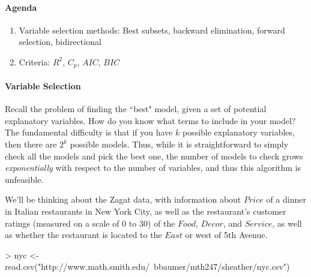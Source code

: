 \documentclass[10pt]{article}
\begin{document}


\paragraph{Agenda}
\begin{enumerate}
  \itemsep0em
  \item Variable selection methods: Best subsets, backward elimination, forward selection, bidirectional
  \item Criteria: $R^2$, $C_p$, $AIC$, $BIC$
\end{enumerate}


\paragraph{Variable Selection}

Recall the problem of finding the ``best" model, given a set of potential explanatory variables. How do you know what terms to include in your model? The fundamental difficulty is that if you have $k$ possible explanatory variables, then there are $2^k$ possible models. Thus, while it is straightforward to simply check all the models and pick the best one, the number of models to check grows \emph{exponentially} with respect to the number of variables, and thus this algorithm is unfeasible.

We'll be thinking about the Zagat data, with information about $Price$ of a dinner in Italian restaurants in New York City, as well as the restaurant's customer ratings (measured on a scale of 0 to 30) of the $Food$, $Decor$, and $Service$, as well as whether the restaurant is located to the $East$ or west of 5th Avenue.
\begin{Schunk}
\begin{Sinput}
> nyc <- read.csv("http://www.math.smith.edu/~bbaumer/mth247/sheather/nyc.csv")
\end{Sinput}
\end{Schunk}
\end{document}
